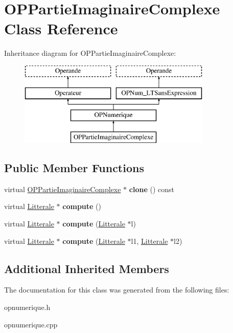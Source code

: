 \hypertarget{class_o_p_partie_imaginaire_complexe}{}\section{O\+P\+Partie\+Imaginaire\+Complexe Class Reference}
\label{class_o_p_partie_imaginaire_complexe}
Inheritance diagram for O\+P\+Partie\+Imaginaire\+Complexe\+:\begin{figure}[H]
\begin{center}
\leavevmode
\includegraphics[height=4.000000cm]{class_o_p_partie_imaginaire_complexe}
\end{center}
\end{figure}
\subsection*{Public Member Functions}
\begin{DoxyCompactItemize}
\item 
virtual \hyperlink{class_o_p_partie_imaginaire_complexe}{O\+P\+Partie\+Imaginaire\+Complexe} $\ast$ {\bfseries clone} () const \hypertarget{class_o_p_partie_imaginaire_complexe_ae01d21bde49edb8106729a0c1b146fb0}{}\label{class_o_p_partie_imaginaire_complexe_ae01d21bde49edb8106729a0c1b146fb0}

\item 
virtual \hyperlink{class_litterale}{Litterale} $\ast$ {\bfseries compute} ()\hypertarget{class_o_p_partie_imaginaire_complexe_a60bcb1c7d4298e3bd8144fc1e7745865}{}\label{class_o_p_partie_imaginaire_complexe_a60bcb1c7d4298e3bd8144fc1e7745865}

\item 
virtual \hyperlink{class_litterale}{Litterale} $\ast$ {\bfseries compute} (\hyperlink{class_litterale}{Litterale} $\ast$l)\hypertarget{class_o_p_partie_imaginaire_complexe_a6de4292de1bfb10206f1d16f86f6a947}{}\label{class_o_p_partie_imaginaire_complexe_a6de4292de1bfb10206f1d16f86f6a947}

\item 
virtual \hyperlink{class_litterale}{Litterale} $\ast$ {\bfseries compute} (\hyperlink{class_litterale}{Litterale} $\ast$l1, \hyperlink{class_litterale}{Litterale} $\ast$l2)\hypertarget{class_o_p_partie_imaginaire_complexe_acce061b9fe7c9919ac76030638c44cc8}{}\label{class_o_p_partie_imaginaire_complexe_acce061b9fe7c9919ac76030638c44cc8}

\end{DoxyCompactItemize}
\subsection*{Additional Inherited Members}


The documentation for this class was generated from the following files\+:\begin{DoxyCompactItemize}
\item 
opnumerique.\+h\item 
opnumerique.\+cpp\end{DoxyCompactItemize}
